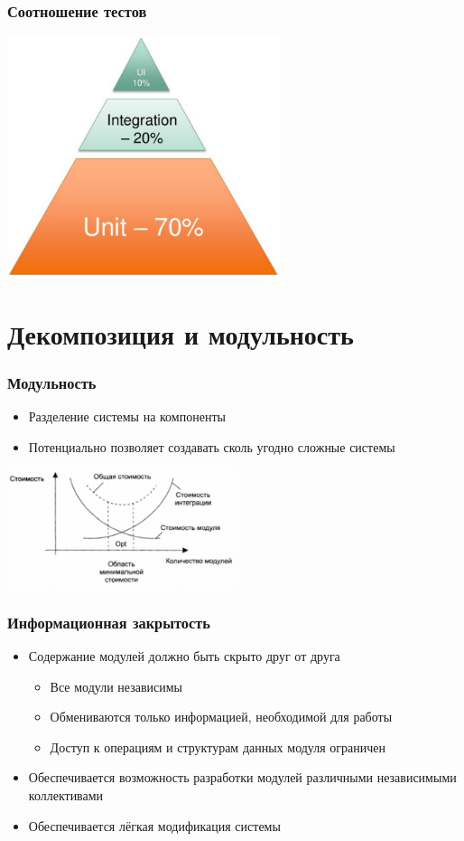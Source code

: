 \documentclass[xetex,mathserif,serif]{beamer}
\begin{document}
	\begin{frame}
		\frametitle{Соотношение тестов}
		\begin{center}
			\includegraphics[width=0.6\textwidth]{testsProportions.png}
		\end{center}
	\end{frame}
	
	\section{Декомпозиция и модульность}

	\begin{frame}
		\frametitle{Модульность}
		\begin{itemize}
			\item Разделение системы на компоненты
			\item Потенциально позволяет создавать сколь угодно сложные системы
		\end{itemize}
		\vskip 1cm
		\begin{center}
			\includegraphics[width=0.5\textwidth]{modulesCost.png}
		\end{center}
	\end{frame}

	\begin{frame}
		\frametitle{Информационная закрытость}
		\begin{itemize}
			\item Со­держание модулей должно быть скрыто друг от друга
			\begin{itemize}
				\item Все модули независимы
				\item Обмениваются только информацией, необходимой для работы
				\item Доступ к операциям и структурам данных модуля ограничен
			\end{itemize}
			\item Обеспечивается возможность разработки модулей различными независимыми коллективами
			\item Обеспечивается лёгкая модификация системы
		\end{itemize}
	\end{frame}
\end{document}
